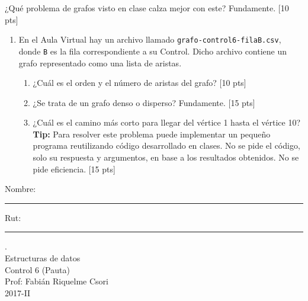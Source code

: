 \documentclass[letter,12pt,oneside]{book}
\theoremstyle{definition}
\begin{document}
  \begin{enumerate}
      {\setlength\itemindent{43pt} \item[b)] ¿Qué problema de grafos visto en clase calza mejor con este? Fundamente. \tabto{86ex} [10 pts]}
  \end{enumerate}
  \begin{enumerate}
    \item[2.] En el Aula Virtual hay un archivo llamado \texttt{grafo-control6-filaB.csv}, donde \texttt{B} es la fila correspondiente a su Control. Dicho archivo contiene un grafo representado como una lista de aristas.
    \begin{enumerate}
        \item ¿Cuál es el orden y el número de aristas del grafo? \tabto{81ex} [10 pts]
        \item ¿Se trata de un grafo denso o disperso? Fundamente. \tabto{81ex} [15 pts]
        \item ¿Cuál es el camino más corto para llegar del vértice 1 hasta el vértice 10?\\[1.5ex]
        \textbf{Tip:} Para resolver este problema puede implementar un pequeño programa reutilizando código desarrollado en clases. No se pide el código, solo su respuesta y argumentos, en base a los resultados obtenidos. No se pide eficiencia. \tabto{81ex} [15 pts]
    \end{enumerate}
\end{enumerate}

\newpage
\noindent
Nombre: \rule{.6\textwidth}{.5pt} Rut: \rule{.24\textwidth}{.5pt}

\begin{center}
 {\Large
  {\color{white}.}\\
  Estructuras de datos\\[1ex]
  Control 6 (Pauta)}\\[1.2ex]
  Prof: Fabián Riquelme Csori\\
  2017-II
\end{center}
\end{document}
